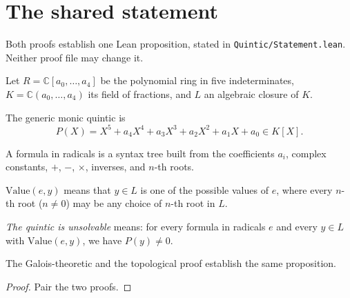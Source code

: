 \chapter{The shared statement}
\label{chap:statement}

Both proofs establish one Lean proposition, stated in \texttt{Quintic/Statement.lean}.
Neither proof file may change it.

\begin{definition}
  \label{def:K}
  \leanok
  Let $R = \mathbb{C}[a_0, \dots, a_4]$ be the polynomial ring in five indeterminates,
  $K = \mathbb{C}(a_0, \dots, a_4)$ its field of fractions, and $L$ an algebraic closure of $K$.
\end{definition}

\begin{definition}
  \label{def:generic-quintic}
  \leanok
  The generic monic quintic is
  \[ P(X) = X^5 + a_4 X^4 + a_3 X^3 + a_2 X^2 + a_1 X + a_0 \in K[X]. \]
\end{definition}

\begin{definition}
  \label{def:radexpr}
  \leanok
  A formula in radicals is a syntax tree built from the coefficients $a_i$,
  complex constants, $+$, $-$, $\times$, inverses, and $n$-th roots.
\end{definition}

\begin{definition}
  \label{def:value}
  \leanok
  $\mathrm{Value}(e, y)$ means that $y \in L$ is one of the possible values of $e$,
  where every $n$-th root ($n \neq 0$) may be any choice of $n$-th root in $L$.
\end{definition}

\begin{definition}
  \label{def:quintic-unsolvable}
  \leanok
  \emph{The quintic is unsolvable} means: for every formula in radicals $e$ and every
  $y \in L$ with $\mathrm{Value}(e, y)$, we have $P(y) \neq 0$.
\end{definition}

\begin{theorem}
  \label{thm:both}
  \leanok
  The Galois-theoretic and the topological proof establish the same proposition.
\end{theorem}

\begin{proof}
  Pair the two proofs.
\end{proof}
